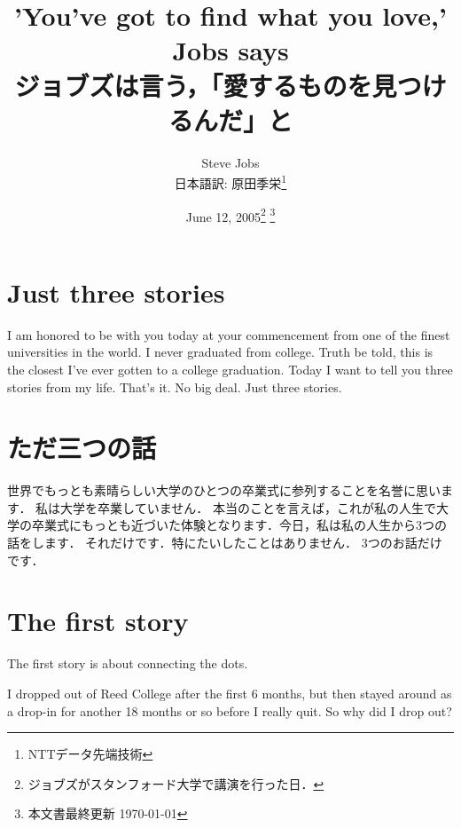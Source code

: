 \documentclass[twocolumn]{jsarticle}
\begin{document}
\title{'You've got to find what you love,' Jobs says \\
ジョブズは言う，「愛するものを見つけるんだ」と}
\date{June 12, 2005\footnote{ジョブズがスタンフォード大学で講演を行った日．}
\footnote{本文書最終更新 \today}}
\author{Steve Jobs \\ 日本語訳: 原田季栄\footnote{NTTデータ先端技術}}

\maketitle



\section*{Just three stories}

I am honored to be with you today at your commencement from one of the finest universities in the world.
I never graduated from college.
Truth be told, this is the closest I've ever gotten to a college graduation.
Today I want to tell you three stories from my life.
That's it.
No big deal.
Just three stories.

\newpage

\section*{ただ三つの話}

世界でもっとも素晴らしい大学のひとつの卒業式に参列することを名誉に思います．
私は大学を卒業していません．
本当のことを言えば，これが私の人生で大学の卒業式にもっとも近づいた体験となります．今日，私は私の人生から3つの話をします．
それだけです．特にたいしたことはありません．
3つのお話だけです．

\newpage

\section*{The first story}

The first story is about connecting the dots.

I dropped out of Reed College after the first 6 months, but then stayed around as a drop-in for another 18 months or so before I really quit. So why did I drop out?

\vspace{\baselineskip}
\end{document}

